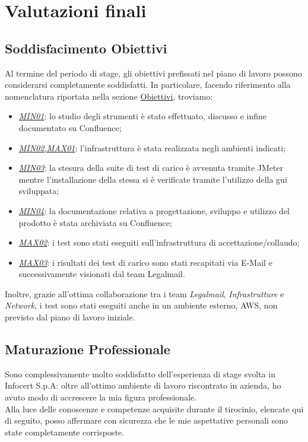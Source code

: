 
\chapter{Valutazioni finali}
\label{cap:analisi-requisiti}
\section{Soddisfacimento Obiettivi}
Al termine del periodo di stage, gli obiettivi prefissati nel piano di lavoro possono considerarsi completamente soddisfatti.
In particolare, facendo riferimento alla nomenclatura riportata nella sezione \hyperref[subsec:obiettivi]{Obiettivi}, troviamo:
\begin{itemize}
	\item \underline{\textit{MIN01}}: lo studio degli strumenti è stato effettuato, discusso e infine documentato su Confluence;
	\item \underline{\textit{MIN02,MAX01}}: l'infrastruttura è stata realizzata negli ambienti indicati;
	\item \underline{\textit{MIN03}}: la stesura della suite di test di carico è avvenuta tramite JMeter mentre l'installazione della stessa si è verificate tramite l'utilizzo della \gls{gui} sviluppata;
	\item \underline{\textit{MIN04}}: la documentazione relativa a progettazione, sviluppo e utilizzo del prodotto è stata archiviata su Confluence;
	\item \underline{\textit{MAX02}}: i test sono stati eseguiti sull'infrastruttura di accettazione/collaudo;
	\item \underline{\textit{MAX03}}: i risultati dei test di carico sono stati recapitati via E-Mail e successivamente visionati dal team Legalmail.
\end{itemize}
Inoltre, grazie all'ottima collaborazione tra i team \textit{Legalmail}, \textit{Infrastrutture} e \textit{Network}, i test sono stati eseguiti anche in un ambiente esterno, AWS, non previsto dal piano di lavoro iniziale.
\section{Maturazione Professionale}
Sono complessivamente molto soddisfatto dell'esperienza di stage svolta in Infocert S.p.A: oltre all'ottimo ambiente di lavoro riscontrato in azienda, ho avuto modo di accrescere la mia figura professionale. \\
Alla luce delle conoscenze e competenze acquisite durante il tirocinio, elencate qui di seguito, posso affermare con sicurezza che le mie aspettative personali sono state completamente corrisposte. 
